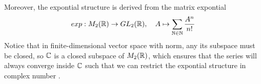 \documentclass[en,geye,blue,pc,12pt]{elegantnote}
\begin{document}
Moreover, the expontial structure is derived from the matrix expontial
\[exp: M_2(\mathbb{R}) \to GL_2(\mathbb{R}), \quad A \mapsto \sum_{\mathbb{N} \in \mathbb{N}} \frac{A^n}{n!}\]
Notice that in finite-dimensional vector space with norm, any its subspace must be closed, so \(\mathbb{C}\) is a closed subspace of \(M_2(\mathbb{R})\), which ensures that the series will always converge inside \(\mathbb{C}\) such that we can restrict the expontial structure in complex number  .
\end{document}
